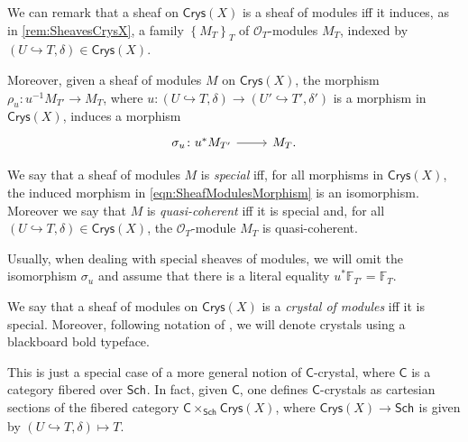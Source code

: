 \begin{rem}[]
	We can remark that a sheaf on $\mathsf{Crys}(X)$ is a sheaf of modules
	iff it induces, as in \cref{rem:SheavesCrysX}, a
	family $\left\{ M_T \right\}_{T}$ of $\mathcal{O}_{ T }$-modules $M_T$, 
	indexed by $\left(U \hookrightarrow T, \delta\right) \in \mathsf{Crys}(X)$.

	Moreover, given a sheaf of modules $M$ on $\mathsf{Crys}(X)$,
	the morphism $\rho_u\colon u^{-1}M_{T'} \to M_T$,
	where $u\colon \left(U \hookrightarrow T, \delta\right) \to
	\left(U' \hookrightarrow T', \delta'\right)$
	is a morphism in $\mathsf{Crys}(X)$, induces a morphism
	\begin{equation}\label{eqn:SheafModulesMorphism}
	\begin{tikzcd}[row sep = 0ex
		,/tikz/column 1/.append style={anchor=base east}
		,/tikz/column 2/.append style={anchor=base west}]
		\sigma_u\colon 
		u^* M_{T'}\arrow[r, "", rightarrow] &
		M_T
	.\end{tikzcd}
	\end{equation} 	
\end{rem}


\begin{defn}[]\label{defn:SpecialQCSheavesCrys}
	We say that a sheaf of modules $M$ is \emph{special}
	iff, for all morphisms in $\mathsf{Crys}(X)$,
	the induced morphism in \cref{eqn:SheafModulesMorphism}
	is an isomorphism.
	Moreover we say that $M$ is \emph{quasi-coherent} iff it is special and, for all
	$\left(U \hookrightarrow T, \delta\right) \in \mathsf{Crys}(X)$, the $\mathcal{O}_{ T }$-module
	$M_T$ is quasi-coherent.
\end{defn}


\begin{rem}[]\label{rem:specialSheavesIso}
	Usually, when dealing with special sheaves of modules, we will omit the isomorphism
	$\sigma_u$ and assume that there is a literal equality
	$u^*\mathbb{F}_{T'} = \mathbb{F}_T$.
\end{rem}


\begin{defn}
	We say that a sheaf of modules on $\mathsf{Crys}(X)$ is 
	a \emph{crystal of modules} iff it is special.
	Moreover, following notation of \cite{Messing}, we will
	denote crystals using a blackboard bold typeface.
\end{defn}


\begin{rem}[]
	This is just a special case of a more general notion 
	of $\mathsf{C}$-crystal, where $\mathsf{C}$ is a category fibered over $\mathsf{Sch}_{  }$.
	In fact, given $\mathsf{C}$, one defines $\mathsf{C}$-crystals as cartesian
	sections of the fibered category $\mathsf{C} \times_{ \mathsf{Sch}_{  } } \mathsf{Crys}(X)$,
	where $\mathsf{Crys}(X) \to \mathsf{Sch}_{  }$ is given by
	$\left(U \hookrightarrow T, \delta\right) \mapsto T$.
\end{rem}


